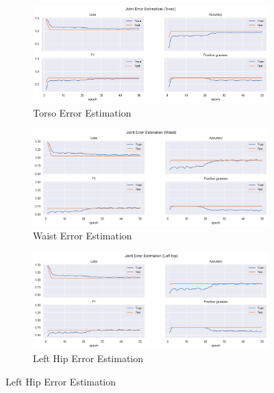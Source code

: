   \begin{figure}[!ht]
    \centering
    \begin{subfigure}[b]{0.47\linewidth}
        \centering
        \includegraphics[width=\textwidth]{figures/Results/v2/jt/Torso_ErrorEstimation.png}
        \caption{Torso Error Estimation}
        \label{fig:v2_torso_jt_ee}
    \end{subfigure}
    \hfill
    \begin{subfigure}[b]{0.47\linewidth}
      \centering
      \includegraphics[width=\textwidth]{figures/Results/v2/jt/Waist_ErrorEstimation.png}
      \caption{Waist Error Estimation}
      \label{fig:v2_waist_jt_ee}
    \end{subfigure}
    \hfill
    \begin{subfigure}[b]{0.47\linewidth}
        \centering
        \includegraphics[width=\textwidth]{figures/Results/v2/jt/Left hip_ErrorEstimation.png}
        \caption{Left Hip Error Estimation}

\end{subfigure}
\end{figure}
